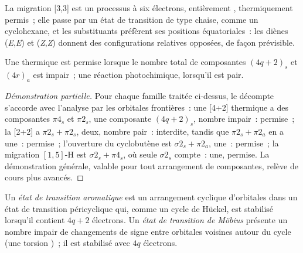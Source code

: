 La migration [3,3] est un processus à six électrons, entièrement
, thermiquement permis~; elle passe par un état de transition de
type chaise, comme un cyclohexane, et les substituants préfèrent ses
positions équatoriales~: les diènes (\textit{E},\textit{E}) et (\textit{Z},\textit{Z}) donnent
des configurations relatives opposées, de façon prévisible.

\begin{theorem}\label{thm:b3:pericyclic:woodward-hoffmann}
Une  thermique est permise lorsque le nombre total de composantes $(4q + 2)_s$ et
$(4r)_a$ est impair~; une réaction photochimique, lorsqu'il est pair.
\end{theorem}

\begin{proof}[Démonstration partielle]
Pour chaque famille traitée ci-dessus, le décompte s'accorde avec
l'analyse par les orbitales frontières~: une  [4+2] thermique a des composantes $\pi4_s$ et $\pi2_s$, une composante $(4q + 2)_s$,
nombre impair~: permise~; la [2+2] a $\pi2_s + \pi2_s$, deux, nombre pair~: interdite, tandis que
$\pi2_s + \pi2_a$ en a une~: permise~; l'ouverture  du cyclobutène est $\sigma2_s + \pi2_a$, une~:
permise~; la migration $[1,5]$-H  est $\sigma2_s + \pi4_s$, où seule $\sigma2_s$ compte~: une,
permise. La démonstration générale, valable pour tout arrangement de
composantes, relève de cours plus avancés.
\end{proof}

\begin{definition}\label{def:b3:pericyclic:mobius}
Un \emph{état de transition aromatique} est un arrangement
cyclique d'orbitales dans un état de transition péricyclique qui, comme un
cycle de Hückel, est stabilisé lorsqu'il contient $4q + 2$ électrons. Un \emph{état de transition de Möbius} présente un nombre impair de changements de signe entre
orbitales voisines autour du cycle (une torsion )~; il est
stabilisé avec $4q$ électrons.
\end{definition}

